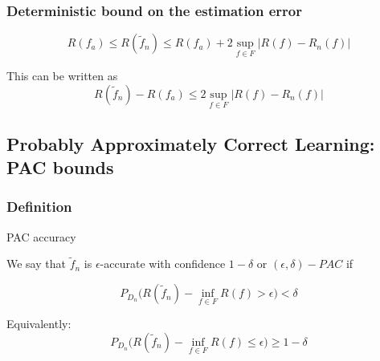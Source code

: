 \documentclass[
10pt, %
a4paper, %
oneside, %
headinclude,footinclude, %
BCOR5mm, %
]{scrartcl}
\begin{document}

    \subsubsection{\large\color{Periwinkle}Deterministic bound on the estimation error}

    \begin{proposition}
	\label{prop:dilemma}
	\begin{equation*}
	    R(f_a)\leq R( \tilde{f}_n)\leq R(f_a)+2 \sup_{f\in F}|R(f)- R_n(f)|
	\end{equation*}
    \end{proposition}

    \begin{remark}
        
	This can be written as
	\begin{equation*}
	    R( \tilde{f}_n)- R(f_a)\leq 2 \sup_{f\in F}|R(f)- R_n(f)|
	\end{equation*}
    \end{remark}

\subsection{\large\color{MidnightBlue}Probably Approximately Correct Learning: PAC bounds}

\subsubsection{\large\color{Periwinkle}Definition}

\begin{definition}{PAC accuracy}

    We say that $ \tilde{f}_n$ is $\epsilon$-accurate with confidence $1-\delta$ or $(\epsilon, \delta)-PAC$ if

    \begin{equation*}
	P_{D_n}\Big(R( \tilde{f}_n)- \inf_{f\in F}R(f)> \epsilon \Big)<\delta
    \end{equation*}

    \begin{remark}
         Equivalently:
	 \begin{equation*}
	P_{D_n}\Big(R( \tilde{f}_n)- \inf_{f\in F}R(f)\leq  \epsilon \Big)\geq 1-\delta
	 \end{equation*}
    \end{remark}
\end{definition}
\end{document}
